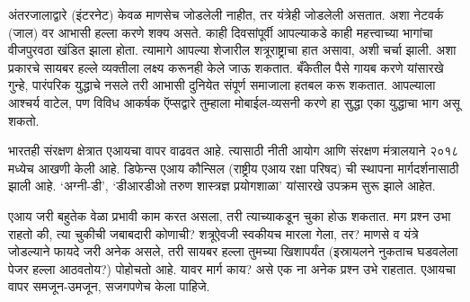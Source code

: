 अंतरजालाद्वारे (इंटरनेट) केवळ माणसेच जोडलेली नाहीत, तर यंत्रेही जोडलेली असतात. अशा नेटवर्क (जाल) वर आभासी हल्ला करणे शक्य असते. काही दिवसांपूर्वी आपल्याकडे काही महत्त्वाच्या भागांचा वीजपुरवठा खंडित झाला होता. त्यामागे आपल्या शेजारील शत्रूराष्ट्राचा हात असावा, अशी चर्चा झाली. अशा प्रकारचे सायबर हल्ले व्यक्तीला लक्ष्य करूनही केले जाऊ शकतात. बँकेतील पैसे गायब करणे यांसारखे गुन्हे, पारंपरिक युद्धाचे नसले तरी आभासी दुनियेत संपूर्ण समाजाला हतबल करू शकतात. आपल्याला आश्चर्य वाटेल, पण विविध आकर्षक ऍप्सद्वारे तुम्हाला मोबाईल-व्यसनी करणे हा सुद्धा एका युद्धाचा भाग असू शकतो.

भारतही संरक्षण क्षेत्रात एआयचा वापर वाढवत आहे. त्यासाठी नीती आयोग आणि संरक्षण मंत्रालयाने २०१८ मध्येच आखणी केली आहे.  डिफेन्स एआय कौन्सिल (राष्ट्रीय एआय रक्षा परिषद) ची स्थापना मार्गदर्शनासाठी झाली आहे. `अग्नी-डी', `डीआरडीओ तरुण शास्त्रज्ञ प्रयोगशाळा' यांसारखे उपक्रम सुरू झाले आहेत.

एआय जरी बहुतेक वेळा प्रभावी काम करत असला, तरी त्याच्याकडून चुका होऊ शकतात. मग प्रश्न उभा राहतो की, त्या चुकीची जबाबदारी कोणाची? शत्रूऐवजी स्वकीयच मारला गेला, तर? माणसे व यंत्रे जोडल्याने फायदे जरी अनेक असले, तरी सायबर हल्ला तुमच्या खिशापर्यंत (इस्रायलने नुकताच घडवलेला पेजर हल्ला आठवतोय?) पोहोचतो आहे. यावर मार्ग काय? असे एक ना अनेक प्रश्न उभे राहतात. एआयचा वापर समजून-उमजून, सजगपणेच केला पाहिजे.